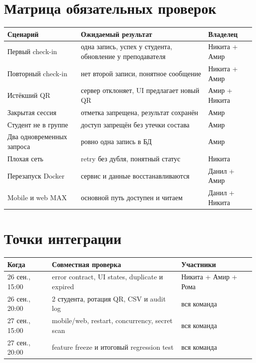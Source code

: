 \documentclass[11pt,a4paper]{article}
\begin{document}
\section{Матрица обязательных проверок}
\begin{tabularx}{\textwidth}{p{36mm}X>{\raggedright\arraybackslash}p{38mm}}\toprule
Сценарий & Ожидаемый результат & Владелец\\\midrule
Первый check-in & одна запись, успех у студента, обновление у преподавателя & Никита + Амир\\
Повторный check-in & нет второй записи, понятное сообщение & Никита + Амир\\
Истёкший QR & сервер отклоняет, UI предлагает новый QR & Амир + Никита\\
Закрытая сессия & отметка запрещена, результат сохранён & Амир\\
Студент не в группе & доступ запрещён без утечки состава & Амир\\
Два одновременных запроса & ровно одна запись в БД & Амир\\
Плохая сеть & retry без дубля, понятный статус & Никита\\
Перезапуск Docker & сервис и данные восстанавливаются & Данил + Амир\\
Mobile и web MAX & основной путь доступен и читаем & Данил + Никита\\\bottomrule
\end{tabularx}

\section{Точки интеграции}
\begin{tabularx}{\textwidth}{p{30mm}X>{\raggedright\arraybackslash}p{37mm}}\toprule
Когда & Совместная проверка & Участники\\\midrule
26 сен., 15:00 & error contract, UI states, duplicate и expired & Никита + Амир + Рома\\
26 сен., 20:00 & 2 студента, ротация QR, CSV и audit log & вся команда\\
27 сен., 15:00 & mobile/web, restart, concurrency, secret scan & вся команда\\
27 сен., 20:00 & feature freeze и итоговый regression test & вся команда\\\bottomrule
\end{tabularx}
\end{document}
